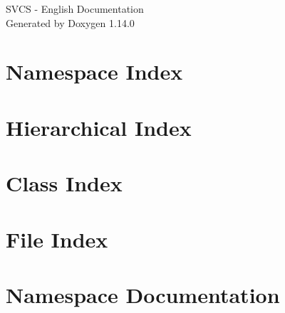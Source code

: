 \documentclass[twoside]{book}
\newcommand{\+}{\discretionary{\mbox{\scriptsize$\hookleftarrow$}}{}{}}
\newcommand{\clearemptydoublepage}{%
    \newpage{\pagestyle{empty}\cleardoublepage}%
  }
\begin{document}
  \raggedbottom
    \hypersetup{pageanchor=false,
                bookmarksnumbered=true,
                pdfencoding=unicode
               }
  \begin{titlepage}
  \vspace*{7cm}
  \begin{center}%
  {\Large SVCS -\/ English Documentation}\\
  \vspace*{1cm}
  {\large Generated by Doxygen 1.14.0}\\
  \end{center}
  \end{titlepage}
  \clearemptydoublepage
  \tableofcontents
  \clearemptydoublepage
  \hypersetup{pageanchor=true}



\chapter{Namespace Index}

\chapter{Hierarchical Index}

\chapter{Class Index}

\chapter{File Index}

\chapter{Namespace Documentation}

\end{document}
